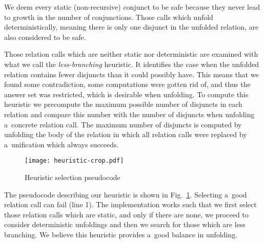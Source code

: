 We deem every static (non-recursive) conjunct to be safe because they never lead to growth in the number of conjunctions.
Those calls which unfold deterministically, meaning there is only one disjunct in the unfolded relation, are also considered to be safe.

Those relation calls which are neither static nor deterministic are examined with what we call the \emph{less-branching} heuristic.
It identifies the case when the unfolded relation contains fewer disjuncts than it could possibly have.
This means that we found some contradiction, some computations were gotten rid of, and thus the answer set was restricted, which is desirable when unfolding.
To compute this heuristic we precompute the maximum possible number of disjuncts in each relation and compare this number with the number of disjuncts when unfolding a~concrete relation call.
The maximum number of disjuncts is computed by unfolding the body of the relation in which all relation calls were replaced by a~unification which always succeeds.

\begin{figure}[h!]
  \centering
  \texttt{[image: heuristic-crop.pdf]}
  \caption{Heuristic selection pseudocode}
  \label{fig:heu-pseudo}
\end{figure}


The pseudocode describing our heuristic is shown in Fig.~\ref{fig:heu-pseudo}.
Selecting a~good relation call can fail (line 1).
The implementation works such that we first select those relation calls which are static, and only if there are none, we proceed to consider deterministic unfoldings and then we search for those which are less branching.
We believe this heuristic provides a~good balance in unfolding.



